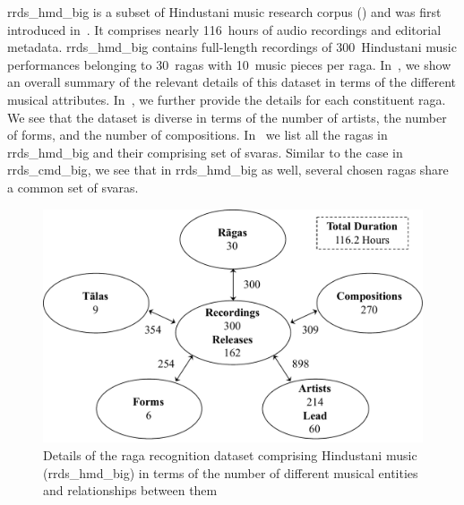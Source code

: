 {{{{\acrshort{rrds_hmd_big} is a subset of Hindustani music research corpus () and was first introduced in~\cite{gulati_tdms_2016}. It comprises nearly 116\, hours of audio recordings and editorial metadata. \acrshort{rrds_hmd_big} contains full-length recordings of 300~Hindustani music performances belonging to 30~\glspl{raga} with 10~music pieces per \gls{raga}. In~, we show an overall summary of the relevant details of this dataset in terms of the different musical attributes. In~, we further provide the details for each constituent \gls{raga}. We see that the dataset is diverse in terms of the number of artists, the number of forms, and the number of compositions. In~ we list all the \glspl{raga} in \acrshort{rrds_hmd_big} and their comprising set of \glspl{svara}. Similar to the case in \acrshort{rrds_cmd_big}, we see that in \acrshort{rrds_hmd_big} as well, several chosen \glspl{raga} share a common set of \glspl{svara}. 




\begin{figure}
	\begin{center}
		\includegraphics[width=\figSizeNinety]{ch04_datasets/figures/hindustani_corpus_ragaDB.pdf}
	\end{center}
	\caption[Details of the \gls{raga} recognition dataset comprising Hindustani music]{Details of the \gls{raga} recognition dataset comprising Hindustani music (\acrshort{rrds_hmd_big}) in terms of the number of different musical entities and relationships between them}
	\label{fig:hindustani_ragaDB_details}
\end{figure}


}}}}
